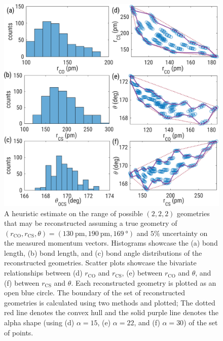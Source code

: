 \begin{figure}
  \centering
  \includegraphics[width=\textwidth]{Plots/OCS222Exploration1_5percent}
  \caption[A heuristic estimate on the range of possible  $(2,2,2)$ geometries that may be reconstructed assuming a true geometry of $(r_\mathrm{CO}, r_\mathrm{CS}, \theta) = (\SI{130}{\pico\m}, \SI{190}{\pico\m}, \SI{169}{\degree})$ and $5\%$ uncertainty on the measured momentum vectors.]
  {A heuristic estimate on the range of possible  $(2,2,2)$ geometries that may be reconstructed assuming a true geometry of $(r_\mathrm{CO}, r_\mathrm{CS}, \theta) = (\SI{130}{\pico\m}, \SI{190}{\pico\m}, \SI{169}{\degree})$ and $5\%$ uncertainty on the measured momentum vectors. Histograms showcase the (a)  bond length, (b)  bond length, and (c) bond angle distributions of the reconstructed geometries. Scatter plots showcase the bivariate relationships between (d) $r_\mathrm{CO}$ and $r_\mathrm{CS}$, (e) between $r_\mathrm{CO}$ and $\theta$, and (f) between $r_\mathrm{CS}$ and $\theta$. Each reconstructed geometry is plotted as an open blue circle. The boundary of the set of reconstructed geometries is calculated using two methods and plotted; The dotted red line denotes the convex hull and the solid purple line denotes the alpha shape (using (d) $\alpha=15$, (e) $\alpha=22$, and (f) $\alpha=30$) of the set of points.}
  \label{fig:OCS222Uncertainty}
\end{figure}

